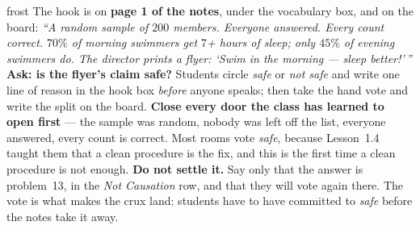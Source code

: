\documentclass[10pt]{article}
\begin{document}
\boxguard
\begin{skillbox}{frost}
The hook is on \textbf{page 1 of the notes}, under the vocabulary box, and on the board:
\textit{``A random sample of $200$ members. Everyone answered. Every count correct. $70\%$ of
morning swimmers get $7$+ hours of sleep; only $45\%$ of evening swimmers do. The director
prints a flyer: `Swim in the morning --- sleep better!'\,''} \textbf{Ask: is the flyer's claim
safe?} Students circle \emph{safe} or \emph{not safe} and write one line of reason in the hook
box \emph{before} anyone speaks; then take the hand vote and write the split on the board.
\textbf{Close every door the class has learned to open first} --- the sample was random, nobody
was left off the list, everyone answered, every count is correct. Most rooms vote \emph{safe},
because Lesson~1.4 taught them that a clean procedure is the fix, and this is the first time a
clean procedure is not enough.
\textbf{Do not settle it.} Say only that the answer is problem~13, in the \emph{Not Causation}
row, and that they will vote again there. The vote is what makes the crux land: students have
to have committed to \emph{safe} before the notes take it away.
\end{skillbox}
\end{document}
